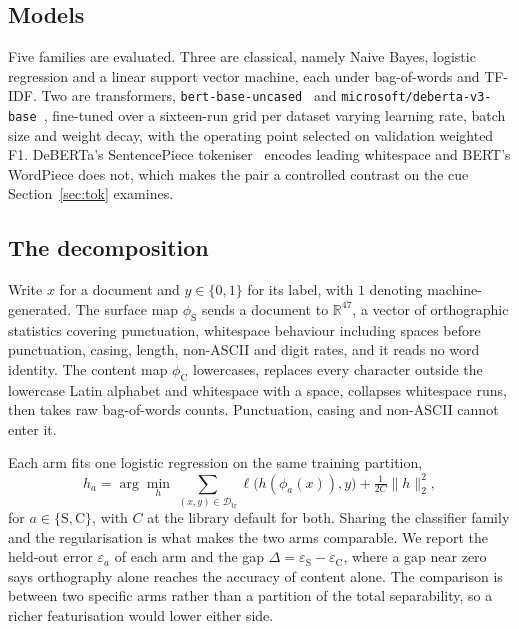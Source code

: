 \subsection{Models}

Five families are evaluated. Three are classical, namely Naive Bayes, logistic regression and a linear support vector machine, each under bag-of-words and TF-IDF. Two are transformers, \texttt{bert-base-uncased}~\cite{Devlin2019bert} and \texttt{microsoft/deberta-v3-base}~\cite{He2023debertav3}, fine-tuned over a sixteen-run grid per dataset varying learning rate, batch size and weight decay, with the operating point selected on validation weighted F1. DeBERTa's SentencePiece tokeniser~\cite{Kudo2018sentencepiece} encodes leading whitespace and BERT's WordPiece does not, which makes the pair a controlled contrast on the cue Section~\ref{sec:tok} examines.

\subsection{The decomposition}
\label{sec:decomp-def}

Write $x$ for a document and $y \in \{0,1\}$ for its label, with $1$ denoting machine-generated. The surface map $\phi_{\mathrm{S}}$ sends a document to $\mathbb{R}^{47}$, a vector of orthographic statistics covering punctuation, whitespace behaviour including spaces before punctuation, casing, length, non-ASCII and digit rates, and it reads no word identity. The content map $\phi_{\mathrm{C}}$ lowercases, replaces every character outside the lowercase Latin alphabet and whitespace with a space, collapses whitespace runs, then takes raw bag-of-words counts. Punctuation, casing and non-ASCII cannot enter it.

Each arm fits one logistic regression on the same training partition,
\begin{equation}
\label{eq:arm}
h_{a} = \arg\min_{h} \, \sum_{(x,y) \in \mathcal{D}_{\text{tr}}} \ell\big(h(\phi_{a}(x)), y\big) + \tfrac{1}{2C}\lVert h \rVert_2^2 ,
\end{equation}
for $a \in \{\mathrm{S},\mathrm{C}\}$, with $C$ at the library default for both. Sharing the classifier family and the regularisation is what makes the two arms comparable. We report the held-out error $\varepsilon_{a}$ of each arm and the gap $\Delta = \varepsilon_{\mathrm{S}} - \varepsilon_{\mathrm{C}}$, where a gap near zero says orthography alone reaches the accuracy of content alone. The comparison is between two specific arms rather than a partition of the total separability, so a richer featurisation would lower either side.

